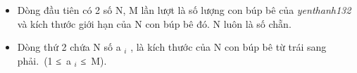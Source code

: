 \begin{itemize}
	\item     Dòng đầu tiên có 2 số N, M lần lượt là số lượng con búp bê của    \emph{     yenthanh132    }    và kích thước giới hạn của N con búp bê đó. N luôn là số chẵn.   
	\item     Dòng thứ 2 chứa N số a    $_     i    $    , là kích thước của N con búp bê từ trái sang phải. (1 ≤ a    $_     i    $    ≤ M).   
\end{itemize}

\